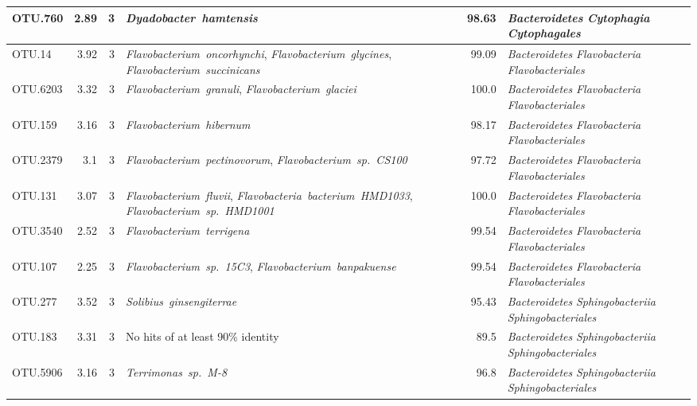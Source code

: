 \begin{ThreePartTable}
\begin{longtable}{lrrP{5cm}rP{5cm}}
OTU.760 & 2.89 & 3 & \mbox{\textit{Dyadobacter hamtensis}} & 98.63 & \mbox{\textit{Bacteroidetes}} \mbox{\textit{Cytophagia}} \mbox{\textit{Cytophagales}} \\ \midrule
OTU.14 & 3.92 & 3 & \mbox{\textit{Flavobacterium oncorhynchi}}, \mbox{\textit{Flavobacterium glycines}}, \mbox{\textit{Flavobacterium succinicans}} & 99.09 & \mbox{\textit{Bacteroidetes}} \mbox{\textit{Flavobacteria}} \mbox{\textit{Flavobacteriales}} \\ \midrule
OTU.6203 & 3.32 & 3 & \mbox{\textit{Flavobacterium granuli}}, \mbox{\textit{Flavobacterium glaciei}} & 100.0 & \mbox{\textit{Bacteroidetes}} \mbox{\textit{Flavobacteria}} \mbox{\textit{Flavobacteriales}} \\ \midrule
OTU.159 & 3.16 & 3 & \mbox{\textit{Flavobacterium hibernum}} & 98.17 & \mbox{\textit{Bacteroidetes}} \mbox{\textit{Flavobacteria}} \mbox{\textit{Flavobacteriales}} \\ \midrule
OTU.2379 & 3.1 & 3 & \mbox{\textit{Flavobacterium pectinovorum}}, \mbox{\textit{Flavobacterium sp. CS100}} & 97.72 & \mbox{\textit{Bacteroidetes}} \mbox{\textit{Flavobacteria}} \mbox{\textit{Flavobacteriales}} \\ \midrule
OTU.131 & 3.07 & 3 & \mbox{\textit{Flavobacterium fluvii}}, \mbox{\textit{Flavobacteria bacterium HMD1033}}, \mbox{\textit{Flavobacterium sp. HMD1001}} & 100.0 & \mbox{\textit{Bacteroidetes}} \mbox{\textit{Flavobacteria}} \mbox{\textit{Flavobacteriales}} \\ \midrule
OTU.3540 & 2.52 & 3 & \mbox{\textit{Flavobacterium terrigena}} & 99.54 & \mbox{\textit{Bacteroidetes}} \mbox{\textit{Flavobacteria}} \mbox{\textit{Flavobacteriales}} \\ \midrule
OTU.107 & 2.25 & 3 & \mbox{\textit{Flavobacterium sp. 15C3}}, \mbox{\textit{Flavobacterium banpakuense}} & 99.54 & \mbox{\textit{Bacteroidetes}} \mbox{\textit{Flavobacteria}} \mbox{\textit{Flavobacteriales}} \\ \midrule
OTU.277 & 3.52 & 3 & \mbox{\textit{Solibius ginsengiterrae}} & 95.43 & \mbox{\textit{Bacteroidetes}} \mbox{\textit{Sphingobacteriia}} \mbox{\textit{Sphingobacteriales}} \\ \midrule
OTU.183 & 3.31 & 3 & {No hits of at least 90\% identity} & 89.5 & \mbox{\textit{Bacteroidetes}} \mbox{\textit{Sphingobacteriia}} \mbox{\textit{Sphingobacteriales}} \\ \midrule
OTU.5906 & 3.16 & 3 & \mbox{\textit{Terrimonas sp. M-8}} & 96.8 & \mbox{\textit{Bacteroidetes}} \mbox{\textit{Sphingobacteriia}} \mbox{\textit{Sphingobacteriales}} \\ \midrule

\end{longtable}
\end{ThreePartTable}
